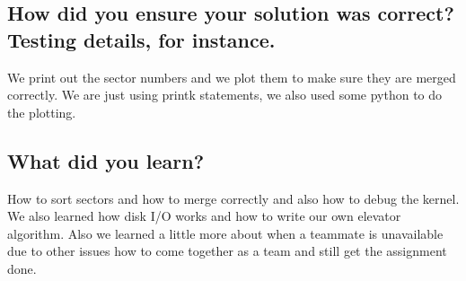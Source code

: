 \documentclass[draftclsnofoot,onecolumn,10pt,compsoc]{IEEEtran}
\begin{document}
\subsection{How did you ensure your solution was correct? Testing details, for instance.}
We print out the sector numbers and we plot them to make sure they are merged correctly.  
We are just using printk statements, we also used some python to do the plotting. 
\subsection{What did you learn?}
How to sort sectors and how to merge correctly and also how to debug the kernel. We also learned how disk I/O works and how to write our own elevator algorithm. Also we learned a little more about when a teammate is unavailable due to other issues how to come together as a team and still get the assignment done.
\end{document}
